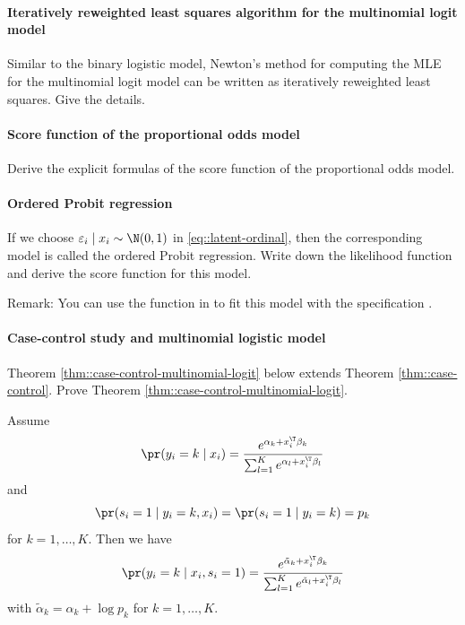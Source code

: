 \paragraph{Iteratively reweighted least squares algorithm for the multinomial logit model}\label{hw18::irls-multinom}

Similar to the binary logistic model, Newton's method for computing the MLE for the multinomial logit model can be written as iteratively reweighted least squares. Give the details. 

\paragraph{Score function of the proportional odds model}\label{hw18::score-pom}

Derive the explicit formulas of the score function of the proportional odds model. 


\paragraph{Ordered Probit regression}\label{hw18::ordered-probit}

If we choose $\varepsilon_i \mid x_i \sim \N(0,1)$ in \eqref{eq::latent-ordinal}, then the corresponding model is called the ordered Probit regression. Write down the likelihood function and derive the score function for this model. 

Remark: You can use the function  in  to fit this model with the specification . 

\paragraph{Case-control study and multinomial logistic model}\label{hw18::case-control-multinom}

Theorem \ref{thm::case-control-multinomial-logit} below extends Theorem \ref{thm::case-control}. Prove Theorem \ref{thm::case-control-multinomial-logit}. 
 


\begin{theorem}
\label{thm::case-control-multinomial-logit}
Assume  
$$
\pr(y_i = k\mid x_i) = \frac{  e^{\alpha_k + x_i^{\T} \beta_k} }{ \sum_{ l =1}^K e^{\alpha_{ l  }+ x_i^{\T} \beta_{ l }} }
$$
and 
$$
\pr(s_i =1\mid y_i = k, x_i) = \pr(s_i =1\mid y_i = k ) = p_k 
$$
for $k=1,\ldots, K$. 
Then we have 
$$
\pr(y_i = k\mid x_i, s_i = 1) = \frac{  e^{\tilde \alpha_k  + x_i^{\T} \beta_k} }{ \sum_{ l =1}^K e^{\tilde \alpha_{ l  }   + x_i^{\T} \beta_{ l }} }
$$
with $\tilde \alpha_k = \alpha_k + \log p_k$ for $k=1,\ldots, K$. 
\end{theorem}

 

